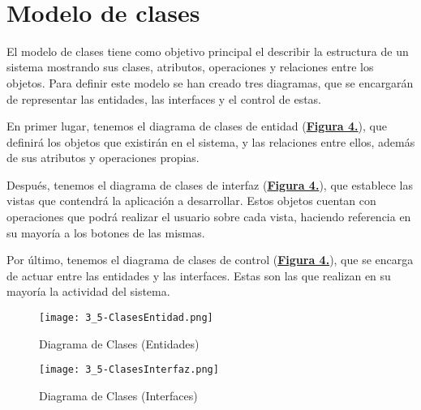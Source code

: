 \newpage~
\section{Modelo de clases}
\label{mc} El modelo de clases tiene como objetivo principal el describir la estructura de un sistema mostrando sus clases, atributos, operaciones y relaciones entre los objetos. Para definir este modelo se han creado tres diagramas, que se encargarán de representar las entidades, las interfaces y el control de estas. \\

\addtocounter{figura_cap4}{1}
En primer lugar, tenemos el diagrama de clases de entidad (\textbf{\hyperref[fig:ClasesEntidad]{Figura 4.}}), que definirá los objetos que existirán en el sistema, y las relaciones entre ellos, además de sus atributos y operaciones propias. \\

\addtocounter{figura_cap4}{1}
Después, tenemos el diagrama de clases de interfaz (\textbf{\hyperref[fig:ClasesInterfaz]{Figura 4.}}), que establece las vistas que contendrá la aplicación a desarrollar. Estos objetos cuentan con operaciones que podrá realizar el usuario sobre cada vista, haciendo referencia en su mayoría a los botones de las mismas. \\

\addtocounter{figura_cap4}{1}
Por último, tenemos el diagrama de clases de control (\textbf{\hyperref[fig:ClasesControl]{Figura 4.}}), que se encarga de actuar entre las entidades y las interfaces. Estas son las que realizan en su mayoría la actividad del sistema.

\begin{landscape}
  \label{fig:ClasesEntidad}
  \vspace*{\fill}
	\begin{figure}[!htbp]
	  \centering
	  \texttt{[image: 3\_5-ClasesEntidad.png]}
	  \caption{Diagrama de Clases (Entidades)}
	\end{figure}
  \vfill
\end{landscape}
\FloatBarrier

\begin{landscape}
  \label{fig:ClasesInterfaz}
  \vspace*{\fill}
  \begin{figure}[!htbp]
    \centering
    \texttt{[image: 3\_5-ClasesInterfaz.png]}
    \caption{Diagrama de Clases (Interfaces)}
  \end{figure}
  \vfill
\end{landscape}
\FloatBarrier


